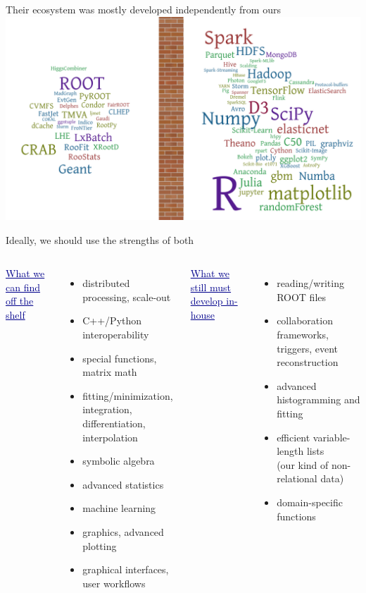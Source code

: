 \documentclass[aspectratio=169]{beamer}
\begin{document}
\begin{frame}{Their ecosystem was mostly developed independently from ours}
\vspace{0.17 cm}
\includegraphics[width=\linewidth]{separation-2.png}
\end{frame}

\begin{frame}{Ideally, we should use the strengths of both}
\vspace{0.5 cm}
\large
\begin{columns}[t]
\textcolor{darkblue}{\underline{What we can find off the shelf}}

\vspace{0.1 cm}
\begin{itemize}\setlength{\itemsep}{0.1 cm}
\item distributed processing, scale-out
\item C++/Python interoperability
\item special functions, matrix math
\item fitting/minimization, integration, differentiation, interpolation
\item symbolic algebra
\item advanced statistics
\item machine learning
\item graphics, advanced plotting
\item graphical interfaces, user workflows
\end{itemize}

\textcolor{darkblue}{\underline{What we still must develop in-house}}

\vspace{0.1 cm}
\begin{itemize}\setlength{\itemsep}{0.1 cm}
\item reading/writing ROOT files
\item collaboration frameworks, triggers, event reconstruction
\item advanced histogramming and fitting
\item efficient variable-length lists \\ (our kind of non-relational data)
\item domain-specific functions
\end{itemize}
\end{columns}
\end{frame}
\end{document}
